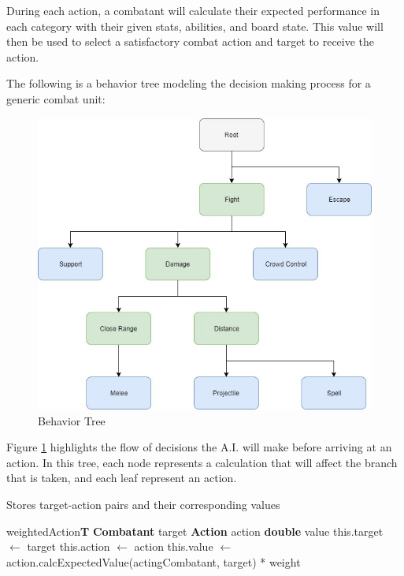 \documentclass[12pt,a4paper]{report}
\begin{document}
		During each action, a combatant will calculate their expected performance in each category with their given stats, abilities, and board state. This value will then be used to select a satisfactory combat action and target to receive the action.
		
		The following is a behavior tree modeling the decision making process for a generic combat unit:
		
		\begin{figure}[H]
			\centering
			\includegraphics[scale=.6]{behaviorTree}
			\caption{Behavior Tree}
			\label{fig: Behavior Tree}
		\end{figure}
		
		Figure \ref{fig: Behavior Tree} highlights the flow of decisions the A.I. will make before arriving at an action. In this tree, each node represents a calculation that will affect the branch that is taken, and each leaf represent an action. 
		
		\begin{algorithm}
			\caption{Stores target-action pairs and their corresponding values}
			\label{table:Weighted Actions}
			\begin{algorithmic}[1]
				\Class \textmd{weightedAction}\textbf{T}
					\State \textbf{Combatant} target
					\State \textbf{Action} action
					\State \textbf{double} value
					\State
						\State this.target $\gets$ target
						\State this.action $\gets$ action
						\State this.value $\gets$ action.calcExpectedValue(actingCombatant, target) * weight
					\EndFunction
				\EndClass
			\end{algorithmic}
		\end{algorithm}
		
\end{document}
